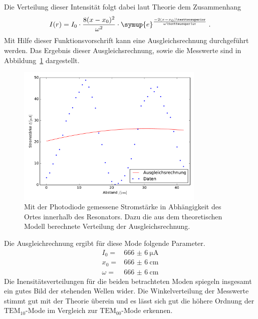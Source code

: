 %
Die Verteilung dieser Intensität folgt dabei laut Theorie dem Zusammenhang
%
\begin{equation}
  I(r)=I_0\cdot\frac{8(x-x_0)^2}{\omega^2}\cdot\symup{e}^{\frac{-2(x-x_0)²}{\omega²}} \; .
\end{equation}
%
Mit Hilfe dieser Funktionsvorschrift kann eine Ausgleichsrechnung durchgeführt werden. Das Ergebnis dieser Ausgleichsrechnung, sowie die Messwerte sind in Abbildung~\ref{fig:tem10} dargestellt.
%
\begin{figure}[htb]
  \centering
  \includegraphics[width=0.8\textwidth]{auswertung/plot_Mode10.pdf}
  \caption{Mit der Photodiode gemessene Stromstärke in Abhängigkeit des Ortes innerhalb des Resonators. Dazu die aus dem theoretischen Modell berechnete Verteilung der Ausgleichsrechnung.}
  \label{fig:tem10}
\end{figure}
%
Die Ausgleichrechnung ergibt für diese Mode folgende Parameter.
%
\begin{align*}
  I_0=&\SI{666(6)}{\micro\ampere} \\
  x_0=&\SI{666(6)}{\centi\meter} \\
  \omega=&\SI{666(6)}{\centi\meter}
\end{align*}
%
Die Inensitätsverteilungen für die beiden betrachteten Moden spiegeln insgesamt ein gutes Bild der stehenden Wellen wider. Die Winkelverteilung
der Messwerte stimmt gut mit der Theorie überein und es lässt sich gut die höhere Ordnung der $\text{TEM}_{10}$-Mode im Vergleich zur $\text{TEM}_{00}$-Mode erkennen.
%
